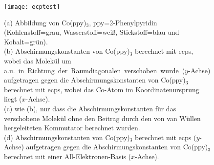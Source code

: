 \vfill
\newpage
\vspace{1cm}
\begin{figure}[ht!]
	\centering
	\texttt{[image: ecptest]}
	\captionsetup{figurewithin = chapter}
	\captionsetup{font=small, labelfont=bf}\caption[ECP-Testrechnungen an Co(ppy)$_3$]{\textsf{(a)} Abbildung von Co(ppy)$_3$, ppy=2-Phenylpyridin (Kohlenstoff=grau, Wasserstoff=weiß, Stickstoff=blau und Kobalt=grün).\\ \textsf{(b)} Abschirmungskonstanten von Co(ppy)$_3$  berechnet mit \acp{ecp}, wobei das Molekül um \unit[10]{a.u.} in Richtung der Raumdiagonalen verschoben wurde ($y$-Achse) aufgetragen gegen die Abschirmungskonstanten von Co(ppy)$_3$ berechnet mit \acp{ecp}, wobei das Co-Atom im Koordinatenursprung liegt ($x$-Achse).\\ \textsf{(c)} wie \textsf{(b)}, nur dass die Abschirmungskonstanten für das verschobene Molekül ohne den Beitrag durch den von van Wüllen hergeleiteten Kommutator berechnet wurden.\\ \textsf{(d)} Abschirmungskonstanten von Co(ppy)$_3$ berechnet mit \acp{ecp} ($y$-Achse) aufgetragen gegen die Abschirmungskonstanten von Co(ppy)$_3$ berechnet mit einer All-Elektronen-Basis ($x$-Achse).}
\label{abb:coppy3test}
\end{figure}
\vfill
\newpage

